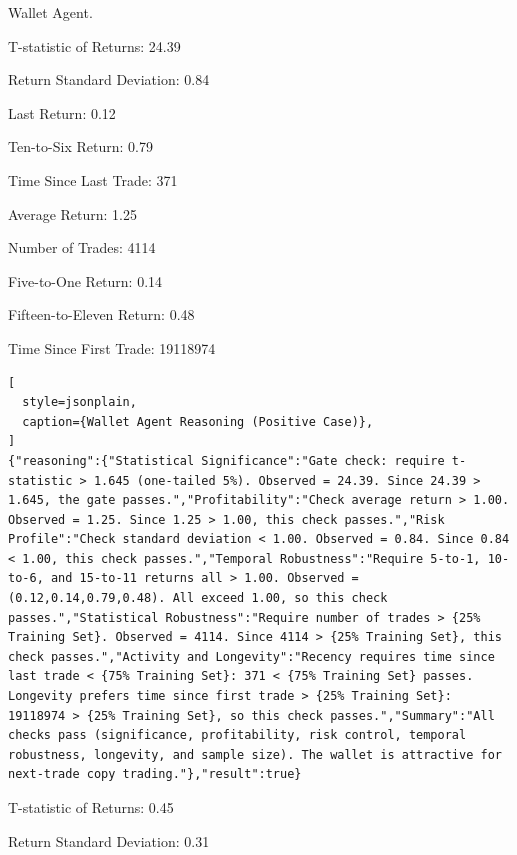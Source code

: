\begin{reasoning}[label={cot:wallet_agent}]{Wallet Agent.}
\begin{minipage}[t]{0.49\linewidth}
T-statistic of Returns: 24.39

Return Standard Deviation: 0.84

Last Return: 0.12

Ten-to-Six Return: 0.79

Time Since Last Trade: 371

\end{minipage}
\hfill
\begin{minipage}[t]{0.50\linewidth}
Average Return: 1.25

Number of Trades: 4114

Five-to-One Return: 0.14

Fifteen-to-Eleven Return: 0.48

Time Since First Trade: 19118974

\end{minipage}

\begin{lstlisting}[
  style=jsonplain,
  caption={Wallet Agent Reasoning (Positive Case)},
]
{"reasoning":{"Statistical Significance":"Gate check: require t-statistic > 1.645 (one-tailed 5%). Observed = 24.39. Since 24.39 > 1.645, the gate passes.","Profitability":"Check average return > 1.00. Observed = 1.25. Since 1.25 > 1.00, this check passes.","Risk Profile":"Check standard deviation < 1.00. Observed = 0.84. Since 0.84 < 1.00, this check passes.","Temporal Robustness":"Require 5-to-1, 10-to-6, and 15-to-11 returns all > 1.00. Observed = (0.12,0.14,0.79,0.48). All exceed 1.00, so this check passes.","Statistical Robustness":"Require number of trades > {25% Training Set}. Observed = 4114. Since 4114 > {25% Training Set}, this check passes.","Activity and Longevity":"Recency requires time since last trade < {75% Training Set}: 371 < {75% Training Set} passes. Longevity prefers time since first trade > {25% Training Set}: 19118974 > {25% Training Set}, so this check passes.","Summary":"All checks pass (significance, profitability, risk control, temporal robustness, longevity, and sample size). The wallet is attractive for next-trade copy trading."},"result":true}
\end{lstlisting}

\begin{minipage}[t]{0.49\linewidth}
T-statistic of Returns: 0.45

Return Standard Deviation: 0.31


\end{minipage}
\end{reasoning}
